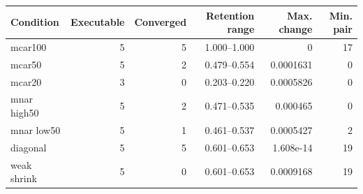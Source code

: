 \begin{tabular}{lrrrrr}
\toprule
Condition & Executable & Converged & Retention range & Max. change & Min. pair \\
\midrule
mcar100 & 5 & 5 & 1.000--1.000 & 0 & 17 \\
mcar50 & 5 & 2 & 0.479--0.554 & 0.0001631 & 0 \\
mcar20 & 3 & 0 & 0.203--0.220 & 0.0005826 & 0 \\
mnar high50 & 5 & 2 & 0.471--0.535 & 0.000465 & 0 \\
mnar low50 & 5 & 1 & 0.461--0.537 & 0.0005427 & 2 \\
diagonal & 5 & 5 & 0.601--0.653 & 1.608e-14 & 19 \\
weak shrink & 5 & 0 & 0.601--0.653 & 0.0009168 & 19 \\
\bottomrule
\end{tabular}
